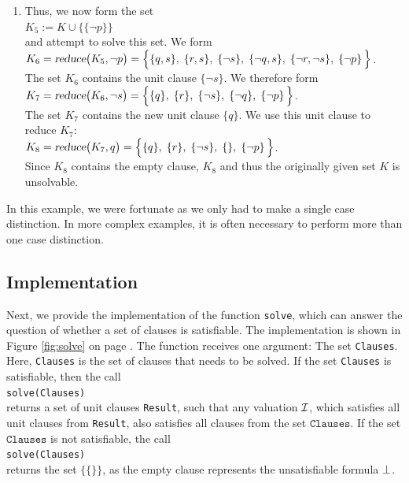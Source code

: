 \begin{enumerate}
\item Thus, we now form the set
      \\[0.2cm]
      \hspace*{1.3cm} $K_5 := K \cup \bigl\{ \{\neg p\} \bigr\}$ \\[0.2cm]
      and attempt to solve this set. We form
      \\[0.2cm]
      \hspace*{1.3cm} 
      $K_6 = \textsl{reduce}\bigl(K_5, \neg p\bigr) =
      \Big\{ \{q, s\},\; \{r, s\},\;\{\neg s\},\; \{\neg q, s\},\; \{\neg r, \neg s\},\;\{\neg p\}\, \Big\}$.
      \\[0.2cm]
      The set $K_6$ contains the unit clause $\{\neg s\}$.
      We therefore form \\[0.2cm]
      \hspace*{1.3cm} 
      $K_7 = \textsl{reduce}\bigl(K_6, \neg s\bigr) =\Big\{ \{q\},\; \{r\},\;\{\neg s\},\; \{\neg q\},\;\{\neg p\}\, \Big\}$.
      \\[0.2cm]
      The set $K_7$ contains the new unit clause $\{q\}$.  We use this unit clause to reduce $K_7$:
      \\[0.2cm]
      \hspace*{1.3cm} 
      $K_8 = \textsl{reduce}\bigl(K_7, q \bigr) =\Big\{ \{q\},\; \{r\},\;\{\neg s\},\; \{\},\;\{\neg p\}\, \Big\}$.
      \\[0.2cm]
      Since $K_8$ contains the empty clause, $K_8$ and thus the originally
      given set $K$ is unsolvable.
\end{enumerate}
In this example, we were fortunate as we only had to make a single case distinction.
In more complex examples, it is often necessary to perform more than one case distinction.

\subsection{Implementation}
Next, we provide the implementation of the function \texttt{solve}, 
which can answer the question of whether a set of clauses is satisfiable. The
implementation is shown in Figure \ref{fig:solve} on page \pageref{fig:solve}.
The function receives one argument: The set \texttt{Clauses}.
Here, \texttt{Clauses} is the set of clauses that needs to be solved. If the set \texttt{Clauses} is
satisfiable, then the call 
\\[0.2cm]
\hspace*{1.3cm}
\texttt{solve(Clauses)} 
\\[0.2cm]
returns a set of unit clauses \texttt{Result}, such
that any valuation $\mathcal{I}$, which satisfies all unit clauses from \texttt{Result}, also satisfies all clauses from
the set $\texttt{Clauses}$. If the set $\texttt{Clauses}$ is not satisfiable, the call
\\[0.2cm]
\hspace*{1.3cm}
\texttt{solve(Clauses)} 
\\[0.2cm]
returns the set $\bigl\{ \{\} \bigr\}$, as the empty clause represents the unsatisfiable formula $\bot$.
 
